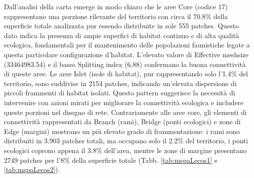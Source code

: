 \documentclass[
  a4paper,
]{book}
\begin{document}
Dall'analisi della carta emerge in modo chiaro che le aree Core (codice 17) rappresentano una porzione rilevante del territorio con circa il 70.8\% della superficie totale analizzata pur essendo distribuite in sole 555 patches.
Questo dato indica la presenza di ampie superfici di habitat continuo e di alta qualità ecologica, fondamentali per il mantenimento delle popolazioni faunistiche legate a questa particolare configurazione d'habitat.
L'elevato valore di Effective meshsize (33464983.54) e il basso Splitting index (6.88) confermano la buona connettività di queste aree.
Le aree Islet (isole di habitat), pur rappresentando solo l'1.4\% del territorio, sono suddivise in 2154 patches, indicando un'elevata dispersione di piccoli frammenti di habitat isolati.
Questo pattern suggerisce la necessità di intervenire con azioni mirati per migliorare la connettività ecologica e includere queste porzioni nel disegno di rete.
Contrariamente alle aree core, gli elementi di connettività rappresentati da Branch (rami), Bridge (ponti ecologici) e zone di Edge (margini) mostrano un più elevato grado di frammentazione: i rami sono distribuiti in 3.903 patches totali, ma occupano solo il 2.2\% del territorio, i ponti ecologici coprono appena il 3.8\% dell'area, mentre le zone di margine presentano 2749 patches per l'8\% della superficie totale (Tabb. \ref{tab:mspaLecos1} e \ref{tab:mspaLecos2}).
\end{document}
